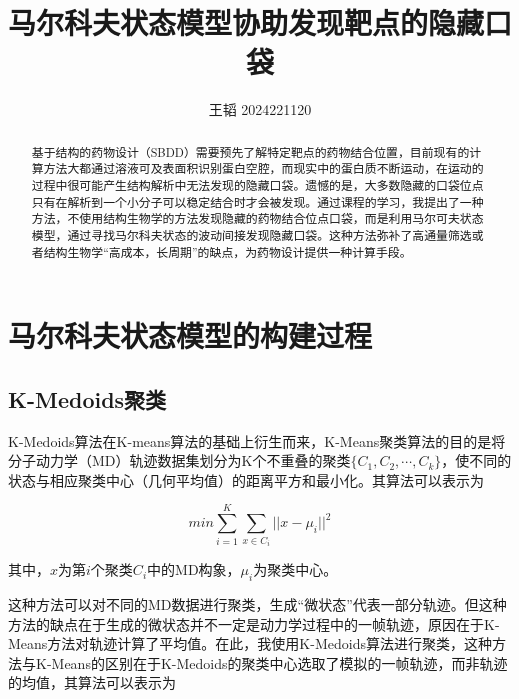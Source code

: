 \documentclass[a4paper]{article}
\title{马尔科夫状态模型协助发现靶点的隐藏口袋}                   %
\author{王韬 2024221120}
\begin{document}
	
\begin{CJK}{UTF8}{gbsn}
\maketitle

\begin{center}
\tableofcontents
\end{center}

 \begin{abstract}

基于结构的药物设计（SBDD）需要预先了解特定靶点的药物结合位置，目前现有的计算方法大都通过溶液可及表面积识别蛋白空腔，而现实中的蛋白质不断运动，在运动的过程中很可能产生结构解析中无法发现的隐藏口袋。遗憾的是，大多数隐藏的口袋位点只有在解析到一个小分子可以稳定结合时才会被发现。通过课程的学习，我提出了一种方法，不使用结构生物学的方法发现隐藏的药物结合位点口袋，而是利用马尔可夫状态模型，通过寻找马尔科夫状态的波动间接发现隐藏口袋。这种方法弥补了高通量筛选或者结构生物学“高成本，长周期”的缺点，为药物设计提供一种计算手段。

 \end{abstract}
\newpage


\section{马尔科夫状态模型的构建过程}
	\subsection{K-Medoids聚类}

K-Medoids算法在K-means算法的基础上衍生而来，K-Means聚类算法的目的是将分子动力学（MD）轨迹数据集划分为K个不重叠的聚类$\{C_{1},C_{2}, \cdots,  C_{k}\}$，使不同的状态与相应聚类中心（几何平均值）的距离平方和最小化。其算法可以表示为

\begin{equation}
min\sum_{i=1}^{K}\sum_{x\in C_{i}}^{} {\vert\vert x- \mu_{i} \vert\vert}^{2}
\end{equation}

其中，$x$为第$i$个聚类$C_{i}$中的MD构象，$\mu_{i}$为聚类中心。


这种方法可以对不同的MD数据进行聚类，生成“微状态”代表一部分轨迹。但这种方法的缺点在于生成的微状态并不一定是动力学过程中的一帧轨迹，原因在于K-Means方法对轨迹计算了平均值。在此，我使用K-Medoids算法进行聚类，这种方法与K-Means的区别在于K-Medoids的聚类中心选取了模拟的一帧轨迹，而非轨迹的均值，其算法可以表示为


\end{CJK}
\end{document}
